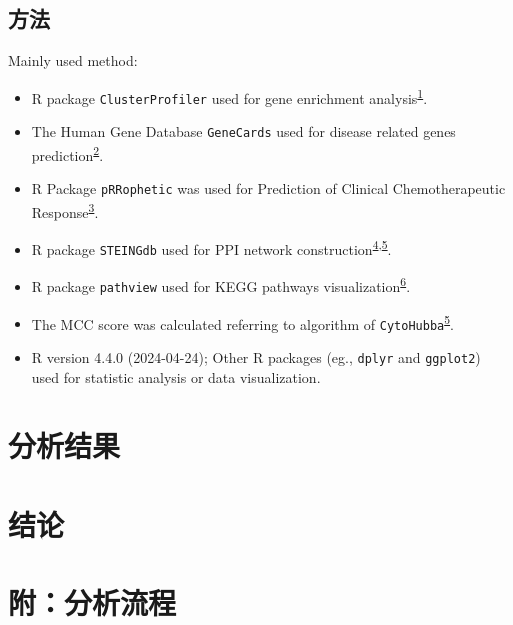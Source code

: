 \documentclass[
]{article}
\providecommand{\tightlist}{%
  \setlength{\itemsep}{0pt}\setlength{\parskip}{0pt}}
\begin{document}
\hypertarget{ux65b9ux6cd5}{%
\subsection{方法}\label{ux65b9ux6cd5}}

Mainly used method:

\begin{itemize}
\tightlist
\item
  R package \texttt{ClusterProfiler} used for gene enrichment analysis\textsuperscript{\protect\hyperlink{ref-ClusterprofilerWuTi2021}{1}}.
\item
  The Human Gene Database \texttt{GeneCards} used for disease related genes prediction\textsuperscript{\protect\hyperlink{ref-TheGenecardsSStelze2016}{2}}.
\item
  R Package \texttt{pRRophetic} was used for Prediction of Clinical Chemotherapeutic Response\textsuperscript{\protect\hyperlink{ref-PrropheticAnGeeleh2014}{3}}.
\item
  R package \texttt{STEINGdb} used for PPI network construction\textsuperscript{\protect\hyperlink{ref-TheStringDataSzklar2021}{4},\protect\hyperlink{ref-CytohubbaIdenChin2014}{5}}.
\item
  R package \texttt{pathview} used for KEGG pathways visualization\textsuperscript{\protect\hyperlink{ref-PathviewAnRLuoW2013}{6}}.
\item
  The MCC score was calculated referring to algorithm of \texttt{CytoHubba}\textsuperscript{\protect\hyperlink{ref-CytohubbaIdenChin2014}{5}}.
\item
  R version 4.4.0 (2024-04-24); Other R packages (eg., \texttt{dplyr} and \texttt{ggplot2}) used for statistic analysis or data visualization.
\end{itemize}

\hypertarget{results}{%
\section{分析结果}\label{results}}

\hypertarget{dis}{%
\section{结论}\label{dis}}

\hypertarget{workflow}{%
\section{附：分析流程}\label{workflow}}
\end{document}
